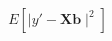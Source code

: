 \documentclass[10pt]{article}
\begin{document}
\[E\left[\mid y' - \textbf{X} \boldsymbol b \mid^2\right]
\]
\end{document}
